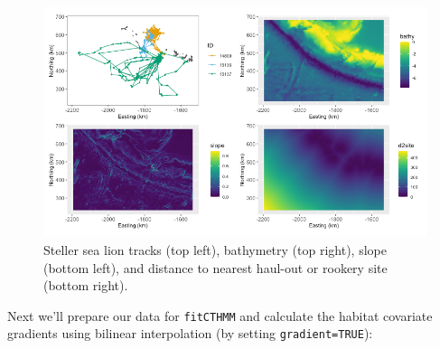 \documentclass[12pt]{article}\usepackage[]{graphicx}\usepackage[]{xcolor}
\begin{document}
\begin{figure}
\center
\includegraphics[width=1\textwidth]{plot_langevinCovs.png}
\caption{Steller sea lion tracks (top left), bathymetry (top right), slope (bottom left), and distance to nearest haul-out or rookery site (bottom right).}
\end{figure}
\noindent Next we'll prepare our data for \verb|fitCTHMM| and calculate the habitat covariate gradients using bilinear interpolation (by setting \verb|gradient=TRUE|):
\end{document}
